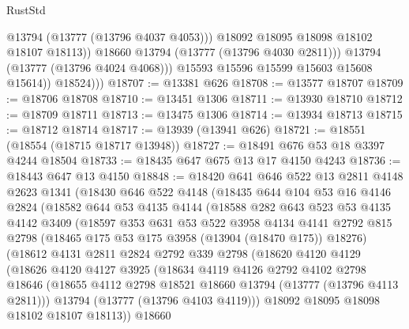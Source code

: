 \begin{lexlean}{RustStd}
\begin{coremodule}
                        @13794
                        (@13777 (@13796 @4037 @4053)))
                      @18092
                      @18095
                      @18098
                      @18102
                      @18107
                      @18113))
                  @18660
                  @13794
                  (@13777 (@13796 @4030 @2811)))
                @13794
                (@13777 (@13796 @4024 @4068)))
              @15593
              @15596
              @15599
              @15603
              @15608
              @15614))
          @18524)))
@18707 := @13381 @626
@18708 := @13577 @18707
@18709 := @18706 @18708
@18710 := @13451 @1306
@18711 := @13930 @18710
@18712 := @18709 @18711
@18713 := @13475 @1306
@18714 := @13934 @18713
@18715 := @18712 @18714
@18717 := @13939 (@13941 @626)
@18721 := @18551 (@18554 (@18715 @18717 @13948))
@18727 := @18491 @676 @53 @18 @3397 @4244 @18504
@18733 := @18435 @647 @675 @13 @17 @4150 @4243
@18736 := @18443 @647 @13 @4150
@18848 := @18420
    @641
    @646
    @522
    @13
    @2811
    @4148
    @2623
    @1341
    (@18430
      @646
      @522
      @4148
      (@18435
        @644
        @104
        @53
        @16
        @4146
        @2824
        (@18582
          @644
          @53
          @4135
          @4144
          (@18588
            @282
            @643
            @523
            @53
            @4135
            @4142
            @3409
            (@18597
              @353
              @631
              @53
              @522
              @3958
              @4134
              @4141
              @2792
              @815
              @2798
              (@18465 @175 @53 @175 @3958 (@13904 (@18470 @175)) @18276)
              (@18612
                @4131
                @2811
                @2824
                @2792
                @339
                @2798
                (@18620
                  @4120
                  @4129
                  (@18626
                    @4120
                    @4127
                    @3925
                    (@18634
                      @4119
                      @4126
                      @2792
                      @4102
                      @2798
                      @18646
                      (@18655 @4112 @2798 @18521 @18660 @13794 (@13777 (@13796 @4113 @2811)))
                      @13794
                      (@13777 (@13796 @4103 @4119)))
                    @18092
                    @18095
                    @18098
                    @18102
                    @18107
                    @18113))
                @18660

\end{coremodule}
\end{lexlean}
